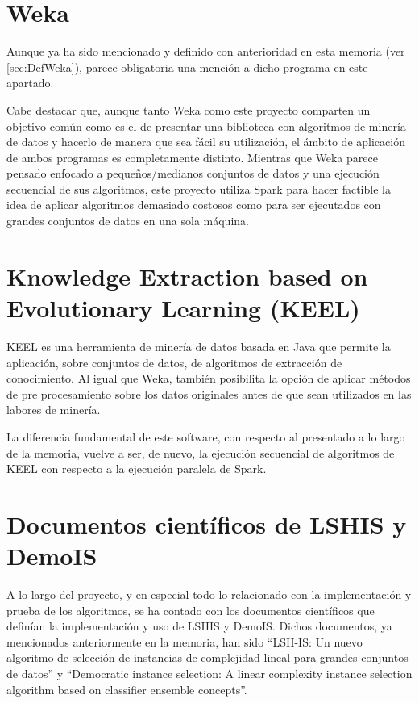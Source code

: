 

\section{Weka}

Aunque ya ha sido mencionado y definido con anterioridad en esta memoria (ver \ref{sec:DefWeka}), parece obligatoria una mención a dicho programa en este apartado.

Cabe destacar que, aunque tanto Weka como este proyecto comparten un objetivo común como es el de presentar una biblioteca con algoritmos de minería de datos y hacerlo de manera que sea fácil su utilización, el ámbito de aplicación de ambos programas es completamente distinto. Mientras que Weka parece pensado enfocado a pequeños/medianos conjuntos de datos y una ejecución secuencial de sus algoritmos, este proyecto utiliza Spark para hacer factible la idea de aplicar algoritmos demasiado costosos como para ser ejecutados con grandes conjuntos de datos en una sola máquina.

\section{Knowledge Extraction based on Evolutionary Learning (KEEL)}

KEEL es una herramienta de minería de datos basada en Java que permite la aplicación, sobre conjuntos de datos, de algoritmos de extracción de conocimiento. Al igual que Weka, también posibilita la opción de aplicar métodos de pre procesamiento sobre los datos originales antes de que sean utilizados en las labores de minería.

La diferencia fundamental de este software, con respecto al presentado a lo largo de la memoria, vuelve a ser, de nuevo, la ejecución secuencial de algoritmos de KEEL con respecto a la ejecución paralela de Spark.

\section{Documentos científicos de LSHIS y DemoIS}

A lo largo del proyecto, y en especial todo lo relacionado con la implementación y prueba de los algoritmos, se ha contado con los documentos científicos que definían la implementación y uso de LSHIS y DemoIS. Dichos documentos, ya mencionados anteriormente en la memoria, han sido ``LSH-IS: Un nuevo algoritmo de selección de instancias de complejidad lineal para grandes conjuntos de datos''\cite{LSHISPaper} y ``Democratic instance selection: A linear complexity instance selection algorithm based on classifier ensemble concepts''\cite{DemoISPaper}.

